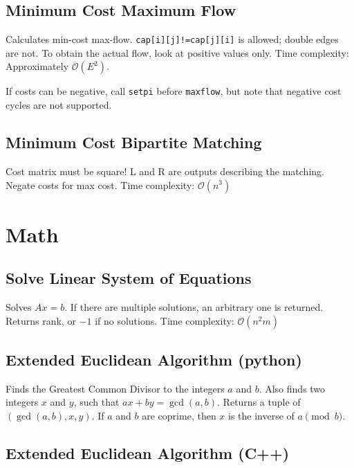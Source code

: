 \documentclass{article}
\begin{document}
\subsection*{Minimum Cost Maximum Flow}

Calculates min-cost max-flow. \lstinline{cap[i][j]!=cap[j][i]} is allowed; double edges are not. To obtain the actual flow, look at positive values only. Time complexity: Approximately $\mathcal{O}(E^2)$.

If costs can be negative, call \lstinline{setpi} before \lstinline{maxflow}, but note that negative cost cycles are not supported.



\pagebreak

\subsection*{Minimum Cost Bipartite Matching}
Cost matrix must be square! L and R are outputs describing the matching. Negate costs for max cost. Time complexity: $\mathcal{O}(n^3)$


\section*{Math}

\subsection*{Solve Linear System of Equations}
Solves $A x = b$. If there are multiple solutions, an arbitrary one is returned.
Returns rank, or $-1$ if no solutions. Time complexity: $\mathcal{O}(n^2 m)$



\subsection*{Extended Euclidean Algorithm (python)}
Finds the Greatest Common Divisor to the integers $a$ and $b$. Also finds two integers $x$ and $y$, such that $ax+by=\gcd(a,b)$.
Returns a tuple of $(\gcd(a, b), x, y)$. If $a$ and $b$ are coprime, then $x$ is the inverse of $a \pmod{b}$.


\subsection*{Extended Euclidean Algorithm (C++)}

\end{document}
